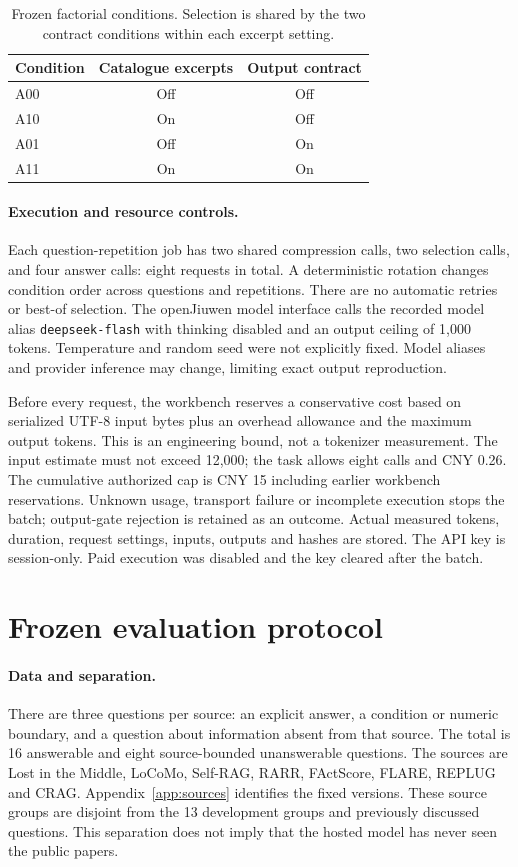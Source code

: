 \documentclass{article}
\begin{document}
\begin{table}[t]
\centering\small
\begin{tabular}{lcc}
\hline
Condition & Catalogue excerpts & Output contract \\
\hline
A00 & Off & Off \\
A10 & On & Off \\
A01 & Off & On \\
A11 & On & On \\
\hline
\end{tabular}
\caption{Frozen factorial conditions. Selection is shared by the two contract conditions within each excerpt setting.}
\end{table}

\paragraph{Execution and resource controls.}
Each question-repetition job has two shared compression calls, two selection calls, and four answer calls: eight requests in total. A deterministic rotation changes condition order across questions and repetitions. There are no automatic retries or best-of selection. The openJiuwen model interface calls the recorded model alias \texttt{deepseek-flash} with thinking disabled and an output ceiling of 1,000 tokens. Temperature and random seed were not explicitly fixed. Model aliases and provider inference may change, limiting exact output reproduction.

Before every request, the workbench reserves a conservative cost based on serialized UTF-8 input bytes plus an overhead allowance and the maximum output tokens. This is an engineering bound, not a tokenizer measurement. The input estimate must not exceed 12,000; the task allows eight calls and CNY 0.26. The cumulative authorized cap is CNY 15 including earlier workbench reservations. Unknown usage, transport failure or incomplete execution stops the batch; output-gate rejection is retained as an outcome. Actual measured tokens, duration, request settings, inputs, outputs and hashes are stored. The API key is session-only. Paid execution was disabled and the key cleared after the batch.

\section{Frozen evaluation protocol}
\paragraph{Data and separation.}
There are three questions per source: an explicit answer, a condition or numeric boundary, and a question about information absent from that source. The total is 16 answerable and eight source-bounded unanswerable questions. The sources are Lost in the Middle, LoCoMo, Self-RAG, RARR, FActScore, FLARE, REPLUG and CRAG. Appendix~\ref{app:sources} identifies the fixed versions. These source groups are disjoint from the 13 development groups and previously discussed questions. This separation does not imply that the hosted model has never seen the public papers.
\end{document}

